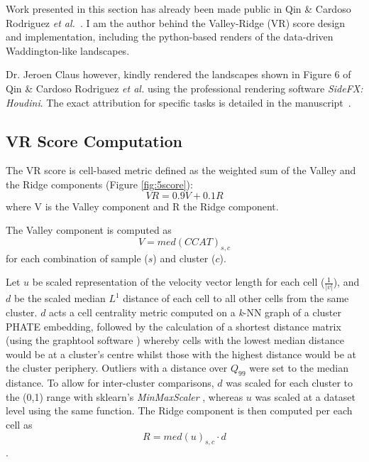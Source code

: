 Work presented in this section has already been made public in Qin \& Cardoso Rodriguez \emph{et al.}~\cite{cardoso_rodriguez_single-cell_2023}. I am the author behind the Valley-Ridge (VR) score design and implementation, including the python-based renders of the data-driven Waddington-like landscapes. 

Dr. Jeroen Claus however, kindly rendered the landscapes shown in Figure 6 of Qin \& Cardoso Rodriguez \emph{et al.} using the professional rendering software \emph{SideFX: Houdini}. The exact attribution for specific tasks is detailed in the manuscript~\cite{cardoso_rodriguez_single-cell_2023}.

\subsection{VR Score Computation}

The VR score is cell-based metric defined as the weighted sum of the Valley and the Ridge components (Figure \ref{fig:5score}):
\[VR = 0.9V+0.1R\]
where V is the Valley component and R the Ridge component.

The Valley component is computed as \[V = med(CCAT)_{s,c}\] for each combination of sample (\(s\)) and cluster (\(c\)). 

Let $u$ be scaled representation of the velocity vector length for each cell ($\frac{1}{|v|}$), and $d$ be the scaled median $L^1$ distance of each cell to all other cells from the same cluster. $d$ acts a cell centrality metric computed on a \emph{k}-NN graph of a cluster PHATE embedding, followed by the calculation of a shortest distance matrix (using the graphtool software \cite{peixoto_graph-tool_2014}) whereby cells with the lowest median distance would be at a cluster's centre whilst those with the highest distance would be at the cluster periphery. Outliers with a distance over $Q_{99}$ were set to the median distance. 
To allow for inter-cluster comparisons, $d$ was scaled for each cluster to the (0,1) range with sklearn's \emph{MinMaxScaler} \cite{pedregosa_scikit-learn_2011}, whereas $u$ was scaled at a dataset level using the same function.
The Ridge component is then computed per each cell as \[R = med(u)_{s,c} \cdot d\]. 


